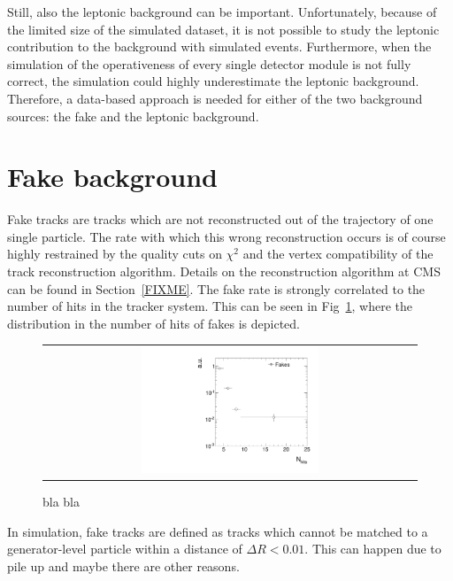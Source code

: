 Still, also the leptonic background can be important.
Unfortunately, because of the limited size of the simulated \WJets dataset, it is not possible to study the leptonic contribution to the background with simulated events.
Furthermore, when the simulation of the operativeness of every single detector module is not fully correct, the simulation could highly underestimate the leptonic background.\\

Therefore, a data-based approach is needed for either of the two background sources: the fake and the leptonic background.
\section{Fake background}
\label{sec:FakeBkg}
Fake tracks are tracks which are not reconstructed out of the trajectory of one single particle.
The rate with which this wrong reconstruction occurs is of course highly restrained by the quality cuts on $\chi^2$ and the vertex compatibility of the track reconstruction algorithm.
Details on the reconstruction algorithm at CMS can be found in Section~\ref{FIXME}.
The fake rate is strongly correlated to the number of hits in the tracker system. 
This can be seen in Fig~\ref{fig:NValidFakes}, where the distribution in the number of hits of fakes is depicted.
\begin{figure}[!bt]
  \centering 
  \begin{tabular}{c}
    \includegraphics[width=0.49\textwidth]{figures/analysis/NValidForFakes_chiTracksfullSelectionNoQCDCutsNoTrigger_PtGt15GeV.pdf}
  \end{tabular}
  \caption{bla bla}
  \label{fig:NValidFakes}
\end{figure}
In simulation, fake tracks are defined as tracks which cannot be matched to a generator-level particle within a distance of $\Delta R < 0.01$.
This can happen due to pile up and maybe there are other reasons.

